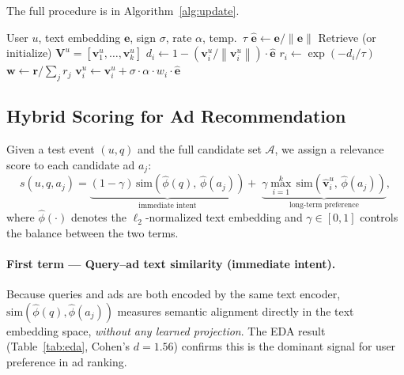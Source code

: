 \documentclass[10pt,twocolumn]{article}
\newcommand{\norm}[1]{\left\|#1\right\|}
\newcommand{\cosim}{\mathrm{sim}}
\begin{document}
The full procedure is in Algorithm~\ref{alg:update}.

\begin{algorithm}[t]
\caption{Online Interest Update}
\label{alg:update}
\begin{algorithmic}[1]
\Require User $u$, text embedding $\bm{e}$, sign $\sigma$, rate $\alpha$, temp.\ $\tau$
\State $\hat{\bm{e}} \leftarrow \bm{e} / \norm{\bm{e}}$
\State Retrieve (or initialize) $\bm{V}^u = [\bm{v}^u_1,\ldots,\bm{v}^u_k]$
  \State $d_i \leftarrow 1 - (\bm{v}^u_i / \norm{\bm{v}^u_i}) \cdot \hat{\bm{e}}$
  \State $r_i \leftarrow \exp(-d_i / \tau)$
\EndFor
\State $\bm{w} \leftarrow \bm{r} / \sum_j r_j$ 
  \State $\bm{v}^u_i \leftarrow \bm{v}^u_i
    + \sigma \cdot \alpha \cdot w_i \cdot \hat{\bm{e}}$
\EndFor
\end{algorithmic}
\end{algorithm}

\subsection{Hybrid Scoring for Ad Recommendation}
\label{sec:scoring}

Given a test event $(u, q)$ and the full candidate set $\mathcal{A}$,
we assign a relevance score to each candidate ad $a_j$:
\begin{equation}
  s(u, q, a_j) =
    \underbrace{(1-\gamma)\,\cosim\!\left(\hat{\phi}(q),\, \hat{\phi}(a_j)\right)}_{\text{immediate intent}}
    +\; \underbrace{\gamma \max_{i=1}^{k}\,
    \cosim\!\left(\hat{\bm{v}}^u_i,\, \hat{\phi}(a_j)\right)}_{\text{long-term preference}},
  \label{eq:score}
\end{equation}
where $\hat{\phi}(\cdot)$ denotes the $\ell_2$-normalized text embedding
and $\gamma \in [0,1]$ controls the balance between the two terms.

\paragraph{First term --- Query--ad text similarity (immediate intent).}
Because queries and ads are both encoded by the same text encoder,
$\cosim(\hat{\phi}(q), \hat{\phi}(a_j))$ measures semantic alignment
directly in the text embedding space, \emph{without any learned
projection}.
The EDA result (Table~\ref{tab:eda}, Cohen's $d = 1.56$) confirms
this is the dominant signal for user preference in ad ranking.
\end{document}
